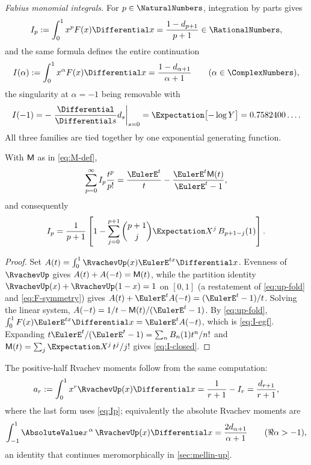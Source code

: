 \emph{Fabius monomial integrals.}  For $p\in\NaturalNumbers$, integration by parts
gives
\begin{equation}
 I_p:=\int_0^1x^pF(x)\Differential x
 =\frac{1-d_{p+1}}{p+1}\in\RationalNumbers,
 \label{eq:Ip}
\end{equation}
and the same formula defines the entire continuation
\begin{equation}
 I(\alpha):=\int_0^1x^\alpha F(x)\Differential x
 =\frac{1-d_{\alpha+1}}{\alpha+1}
 \qquad(\alpha\in\ComplexNumbers),
 \label{eq:Ialpha}
\end{equation}
the singularity at $\alpha=-1$ being removable with
\begin{equation}
 I(-1)=-\left.\frac{\Differential}{\Differential s}d_s\right|_{s=0}
 =\Expectation\bigl[-\log Y\bigr]
 =0.7582400\ldots.
 \label{eq:Iminus1}
\end{equation}
All three families are tied together by one exponential generating
function.

\begin{theorem}
\label{thm:moment-egf}
With $\mathsf M$ as in \eqref{eq:M-def},
\begin{equation}
 \sum_{p=0}^{\infty}I_p\frac{t^p}{p!}
 =\frac{\EulerE^{t}}{t}-\frac{\EulerE^{t}\MM(t)}{\EulerE^{t}-1},
 \label{eq:I-egf}
\end{equation}
and consequently
\begin{equation}
 I_p=\frac1{p+1}\left[
 1-\sum_{j=0}^{p+1}\binom{p+1}{j}\Expectation X^{j}\,B_{p+1-j}(1)
 \right].
 \label{eq:I-closed}
\end{equation}
\end{theorem}

\begin{proof}
Set $A(t)=\int_0^1\RvachevUp(x)\EulerE^{tx}\Differential x$.  Evenness of $\RvachevUp$ gives
$A(t)+A(-t)=\mathsf M(t)$, while the partition identity
$\RvachevUp(x)+\RvachevUp(1-x)=1$ on $[0,1]$ (a restatement of
\eqref{eq:up-fold} and \eqref{eq:F-symmetry}) gives
$A(t)+\EulerE^{t}A(-t)=(\EulerE^{t}-1)/t$.  Solving the linear system,
$A(-t)=1/t-\MM(t)/(\EulerE^{t}-1)$.  By \eqref{eq:up-fold},
$\int_0^1F(x)\EulerE^{tx}\Differential x=\EulerE^{t}A(-t)$, which is \eqref{eq:I-egf}.
Expanding $t\EulerE^{t}/(\EulerE^{t}-1)=\sum_nB_n(1)t^n/n!$ and
$\MM(t)=\sum_j\Expectation X^j\,t^j/j!$ gives \eqref{eq:I-closed}.
\end{proof}

The positive-half Rvachev moments follow from the same computation:
\begin{equation}
 a_r:=\int_0^1x^r\RvachevUp(x)\Differential x
 =\frac1{r+1}-I_r
 =\frac{d_{r+1}}{r+1},
 \label{eq:a-r}
\end{equation}
where the last form uses \eqref{eq:Ip}; equivalently the absolute
Rvachev moments are
\begin{equation}
 \int_{-1}^{1}\AbsoluteValue x^{\,\alpha}\,\RvachevUp(x)\Differential x
 =\frac{2d_{\alpha+1}}{\alpha+1}
 \qquad(\Re\alpha>-1),
 \label{eq:absolute-continuous}
\end{equation}
an identity that continues meromorphically in \cref{sec:mellin-up}.

